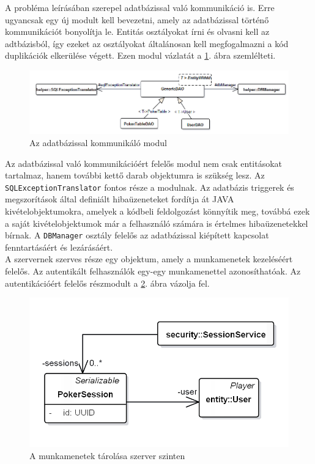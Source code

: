 A probléma leírásában szerepel adatbázissal való kommunikáció is. Erre ugyancsak egy új modult kell bevezetni, amely az adatbázissal történő kommunikációt bonyolítja le. Entitás osztályokat írni és olvasni kell az adtbázisból, így ezeket az osztályokat általánosan kell megfogalmazni a kód duplikációk elkerülése végett. Ezen modul vázlatát a \ref{fig:persist}. ábra szemlélteti. \\
\begin{figure}[h!]
	\caption{Az adatbázissal kommunikáló modul}
	\label{fig:persist}
	\centering
	\includegraphics[width=\linewidth]{developer-documentation/images/dao.png}
\end{figure}
Az adatbázissal való kommunikációért felelős modul nem csak entitásokat tartalmaz, hanem további kettő darab objektumra is szükség lesz. Az \texttt{SQLExceptionTranslator} fontos része a modulnak. Az adatbázis triggerek és megszorítások által definiált hibaüzeneteket fordítja át JAVA kivételobjektumokra, amelyek a kódbeli feldolgozást könnyítik meg, továbbá ezek a saját kivételobjektumok már a felhasználó számára is értelmes hibaüzenetekkel bírnak. A \texttt{DBManager} osztály felelős az adatbázissal kiépített kapcsolat fenntartásáért és lezárásáért. \\
A szervernek szerves része egy objektum, amely a munkamenetek kezeléséért felelős. Az autentikált felhasználók egy-egy munkamenettel azonosíthatóak. Az autentikációért felelős részmodult a \ref{fig:sessionservice}. ábra vázolja fel.
\begin{figure}[h!]
	\caption{A munkamenetek tárolása szerver szinten}
	\label{fig:sessionservice}
	\centering
	\includegraphics[width=\linewidth]{developer-documentation/images/session.png}
\end{figure}
